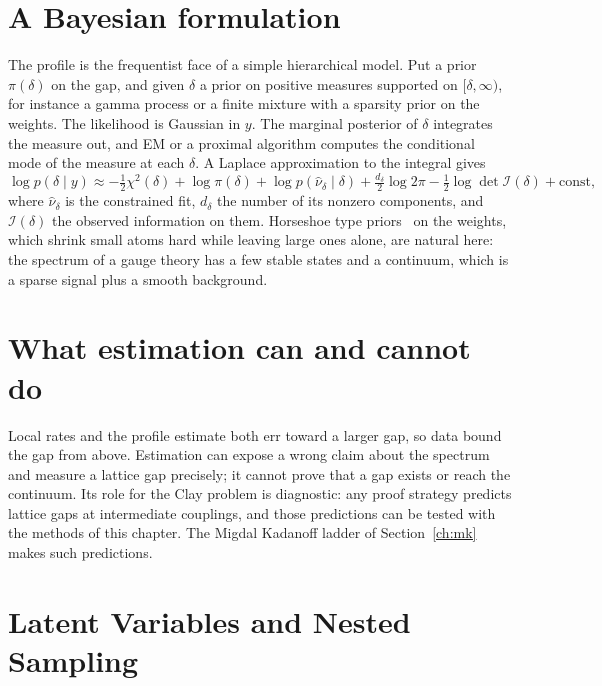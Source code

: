 \section{A Bayesian formulation}

The profile is the frequentist face of a simple hierarchical model. Put a prior $\pi(\delta)$ on the gap, and given $\delta$ a prior on positive measures supported on $[\delta,\infty)$, for instance a gamma process or a finite mixture with a sparsity prior on the weights. The likelihood is Gaussian in $y$. The marginal posterior of $\delta$ integrates the measure out, and EM or a proximal algorithm computes the conditional mode of the measure at each $\delta$. A Laplace approximation to the integral gives
\[
\log p(\delta\mid y)\approx-\tfrac12\chi^2(\delta)+\log\pi(\delta)+\log p(\hat\nu_\delta\mid\delta)+\tfrac{d_\delta}{2}\log2\pi-\tfrac12\log\det\mathcal I(\delta)+\text{const},
\]
where $\hat\nu_\delta$ is the constrained fit, $d_\delta$ the number of its nonzero components, and $\mathcal I(\delta)$ the observed information on them. Horseshoe type priors~\cite{CPS10} on the weights, which shrink small atoms hard while leaving large ones alone, are natural here: the spectrum of a gauge theory has a few stable states and a continuum, which is a sparse signal plus a smooth background.

\section{What estimation can and cannot do}

Local rates and the profile estimate both err toward a larger gap, so data bound the gap from above. Estimation can expose a wrong claim about the spectrum and measure a lattice gap precisely; it cannot prove that a gap exists or reach the continuum. Its role for the Clay problem is diagnostic: any proof strategy predicts lattice gaps at intermediate couplings, and those predictions can be tested with the methods of this chapter. The Migdal Kadanoff ladder of Section~\ref{ch:mk} makes such predictions.

\section{Latent Variables and Nested Sampling}\label{ch:latent}

